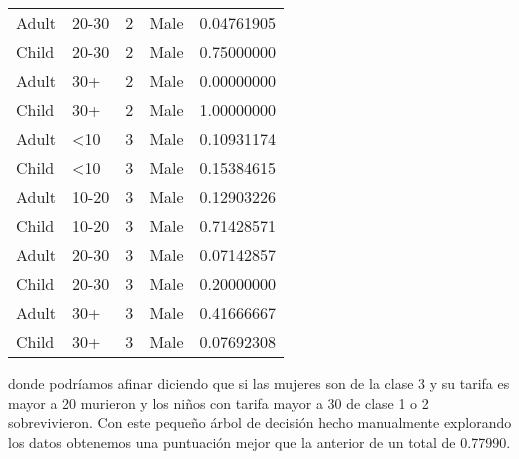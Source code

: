 \begin{table}[H]
\begin{tabular}{|llll|l|}
		Adult & 20-30       & 2      & Male   & 0.04761905 \\
		Child & 20-30       & 2      & Male   & 0.75000000 \\
		Adult & 30+         & 2      & Male   & 0.00000000 \\
		Child & 30+         & 2      & Male   & 1.00000000 \\
		Adult & \textless10 & 3      & Male   & 0.10931174 \\
		Child & \textless10 & 3      & Male   & 0.15384615 \\
		Adult & 10-20       & 3      & Male   & 0.12903226 \\
		Child & 10-20       & 3      & Male   & 0.71428571 \\
		Adult & 20-30       & 3      & Male   & 0.07142857 \\
		Child & 20-30       & 3      & Male   & 0.20000000 \\
		Adult & 30+         & 3      & Male   & 0.41666667 \\
		Child & 30+         & 3      & Male   & 0.07692308 \\ \hline
	\end{tabular}
\end{table}

donde podríamos afinar diciendo que si las mujeres son de la clase 3 y su tarifa es mayor a 20 murieron y los niños con tarifa mayor a 30 de clase 1 o 2 sobrevivieron. Con este pequeño árbol de decisión hecho manualmente explorando los datos obtenemos una puntuación mejor que la anterior de un total de 0.77990.


\newpage


